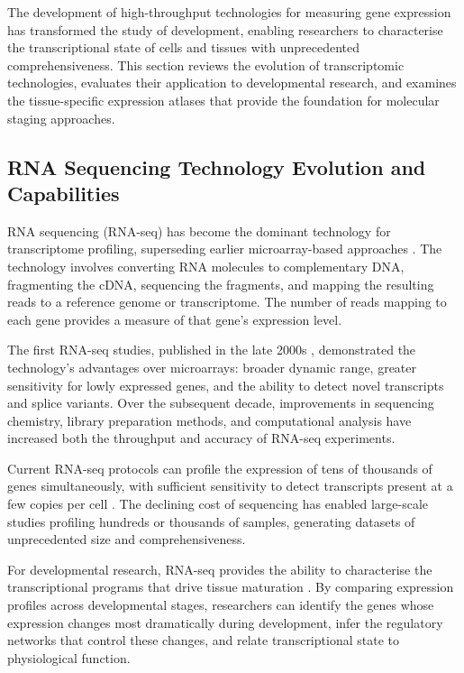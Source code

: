 The development of high-throughput technologies for measuring gene expression has transformed the study of development, enabling researchers to characterise the transcriptional state of cells and tissues with unprecedented comprehensiveness. This section reviews the evolution of transcriptomic technologies, evaluates their application to developmental research, and examines the tissue-specific expression atlases that provide the foundation for molecular staging approaches.

\subsection{RNA Sequencing Technology Evolution and Capabilities}

RNA sequencing (RNA-seq) has become the dominant technology for transcriptome profiling, superseding earlier microarray-based approaches \parencite{marioni_rna-seq_2008}. The technology involves converting RNA molecules to complementary DNA, fragmenting the cDNA, sequencing the fragments, and mapping the resulting reads to a reference genome or transcriptome. The number of reads mapping to each gene provides a measure of that gene's expression level.

The first RNA-seq studies, published in the late 2000s \parencite{mortazavi_mapping_2008, wang_rna-seq_2009}, demonstrated the technology's advantages over microarrays: broader dynamic range, greater sensitivity for lowly expressed genes, and the ability to detect novel transcripts and splice variants. Over the subsequent decade, improvements in sequencing chemistry, library preparation methods, and computational analysis have increased both the throughput and accuracy of RNA-seq experiments.

Current RNA-seq protocols can profile the expression of tens of thousands of genes simultaneously, with sufficient sensitivity to detect transcripts present at a few copies per cell \parencite{wang_rna-seq_2009}. The declining cost of sequencing has enabled large-scale studies profiling hundreds or thousands of samples, generating datasets of unprecedented size and comprehensiveness.

For developmental research, RNA-seq provides the ability to characterise the transcriptional programs that drive tissue maturation \parencite{cardoso-moreira_gene_2019}. By comparing expression profiles across developmental stages, researchers can identify the genes whose expression changes most dramatically during development, infer the regulatory networks that control these changes, and relate transcriptional state to physiological function.

